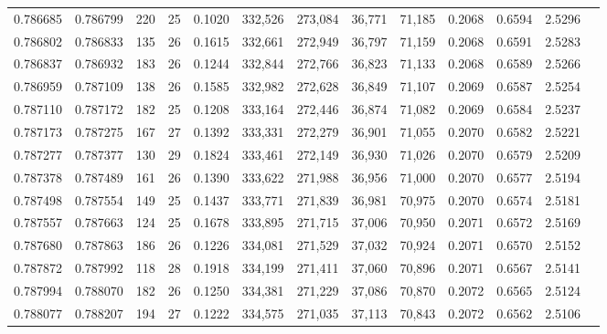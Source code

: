 \begin{tabular}{rrrrrrrrrrrrr}
0.786685 & 0.786799 &   220 &  25 &                                     0.1020 & 332,526 & 273,084 &  36,771 &  71,185 & 0.2068 & 0.6594 & 2.5296 \\
0.786802 & 0.786833 &   135 &  26 &                                     0.1615 & 332,661 & 272,949 &  36,797 &  71,159 & 0.2068 & 0.6591 & 2.5283 \\
0.786837 & 0.786932 &   183 &  26 &                                     0.1244 & 332,844 & 272,766 &  36,823 &  71,133 & 0.2068 & 0.6589 & 2.5266 \\
0.786959 & 0.787109 &   138 &  26 &                                     0.1585 & 332,982 & 272,628 &  36,849 &  71,107 & 0.2069 & 0.6587 & 2.5254 \\
0.787110 & 0.787172 &   182 &  25 &                                     0.1208 & 333,164 & 272,446 &  36,874 &  71,082 & 0.2069 & 0.6584 & 2.5237 \\
0.787173 & 0.787275 &   167 &  27 &                                     0.1392 & 333,331 & 272,279 &  36,901 &  71,055 & 0.2070 & 0.6582 & 2.5221 \\
0.787277 & 0.787377 &   130 &  29 &                                     0.1824 & 333,461 & 272,149 &  36,930 &  71,026 & 0.2070 & 0.6579 & 2.5209 \\
0.787378 & 0.787489 &   161 &  26 &                                     0.1390 & 333,622 & 271,988 &  36,956 &  71,000 & 0.2070 & 0.6577 & 2.5194 \\
0.787498 & 0.787554 &   149 &  25 &                                     0.1437 & 333,771 & 271,839 &  36,981 &  70,975 & 0.2070 & 0.6574 & 2.5181 \\
0.787557 & 0.787663 &   124 &  25 &                                     0.1678 & 333,895 & 271,715 &  37,006 &  70,950 & 0.2071 & 0.6572 & 2.5169 \\
0.787680 & 0.787863 &   186 &  26 &                                     0.1226 & 334,081 & 271,529 &  37,032 &  70,924 & 0.2071 & 0.6570 & 2.5152 \\
0.787872 & 0.787992 &   118 &  28 &                                     0.1918 & 334,199 & 271,411 &  37,060 &  70,896 & 0.2071 & 0.6567 & 2.5141 \\
0.787994 & 0.788070 &   182 &  26 &                                     0.1250 & 334,381 & 271,229 &  37,086 &  70,870 & 0.2072 & 0.6565 & 2.5124 \\
0.788077 & 0.788207 &   194 &  27 &                                     0.1222 & 334,575 & 271,035 &  37,113 &  70,843 & 0.2072 & 0.6562 & 2.5106 \\

\end{tabular}
